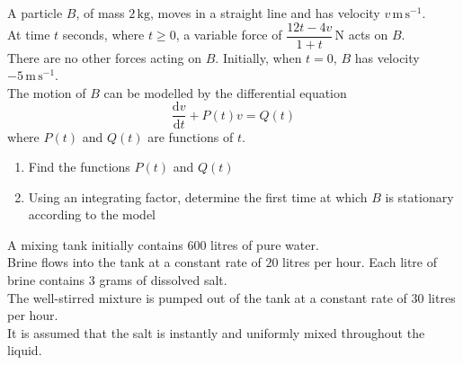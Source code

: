 \documentclass[leqno]{article}
\begin{document}
\djsFrontMatter
\begin{enumerate}[
  label=\textbf{\arabic*.},
  leftmargin=*,
  topsep=0pt,
  partopsep=0pt,
  parsep=0pt
]

\questionitem

A particle $B$, of mass $2\,\mathrm{kg}$, moves in a straight line and has velocity $v\,\mathrm{m\,s^{-1}}$. \\

At time $t$ seconds, where $t\ge 0$, a variable force of $\dfrac{12t-4v}{1+t}\,\mathrm{N}$ acts on $B$.\\

There are no other forces acting on $B$. Initially, when $t=0$, $B$ has velocity $-5\,\mathrm{m\,s^{-1}}$. \\

The motion of $B$ can be modelled by the differential equation
\[
\frac{\mathrm{d}v}{\mathrm{d}t}+P(t)v=Q(t)
\]
where $P(t)$ and $Q(t)$ are functions of $t$. \\

\begin{enumerate}[label=\textbf{(\alph*)}]
  \item Find the functions $P(t)$ and $Q(t)$  \\
  \item Using an integrating factor, determine the first time at which $B$ is stationary according to the model  \\
\end{enumerate}

\newpage

\questionitem

A mixing tank initially contains $600$ litres of pure water. \\

Brine flows into the tank at a constant rate of $20$ litres per hour. Each litre of brine contains $3$ grams of dissolved salt. \\

The well-stirred mixture is pumped out of the tank at a constant rate of $30$ litres per hour. \\

It is assumed that the salt is instantly and uniformly mixed throughout the liquid. \\


\end{enumerate}
\end{document}
